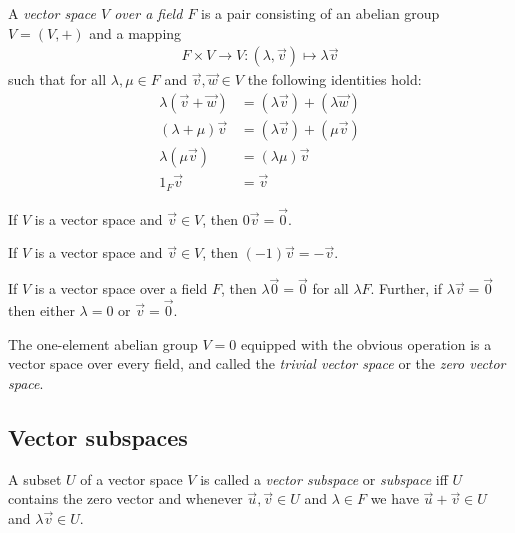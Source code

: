 \documentclass{article}
\begin{document}
\begin{definition}
	A \emph{vector space $V$ over a field $F$} is a pair consisting of an abelian
	group $V=(V,+)$ and a mapping
	\begin{align*}
		F\times V\to V:(\lambda,\vec v) \mapsto \lambda \vec v
	\end{align*}
	such that for all $\lambda,\mu\in F$ and $\vec v,\vec w\in V$ the following
	identities hold:
	\begin{align*}
		\lambda(\vec v + \vec w) & = (\lambda\vec v) + (\lambda \vec w) \\
		(\lambda +\mu)\vec v     & = (\lambda\vec v) + (\mu \vec v)     \\
		\lambda(\mu\vec v)       & = (\lambda\mu)\vec v                 \\
		1_F \vec v               & = \vec v
	\end{align*}
\end{definition}

\begin{lemma}[Notes 1.2.2]
	If $V$ is a vector space and $\vec v\in V$, then $0\vec v =\vec 0$.
\end{lemma}

\begin{lemma}[Notes 1.2.3]
	If $V$ is a vector space and $\vec v\in V$, then $(-1)\vec v = -\vec v$.
\end{lemma}

\begin{lemma}[Notes 1.2.4]
	If $V$ is a vector space over a field $F$, then $\lambda\vec 0=\vec 0$
	for all $\lambda F$. Further, if $\lambda\vec v=\vec 0$ then either
	$\lambda =0$ or $\vec v =\vec 0$.
\end{lemma}

\begin{definition}
	The one-element abelian group $V=0$ equipped with the
	obvious operation is a vector space over every field, and called the
	\emph{trivial vector space} or the \emph{zero vector space}.
\end{definition}

\subsection{Vector subspaces}

\begin{definition}
	A subset $U$ of a vector space $V$ is called a \emph{vector subspace} or
	\emph{subspace} iff $U$ contains the zero vector and whenever $\vec u,\vec v\in U$
	and $\lambda\in F$ we have $\vec u + \vec v\in U$ and $\lambda\vec v\in U$.
\end{definition}
\end{document}
